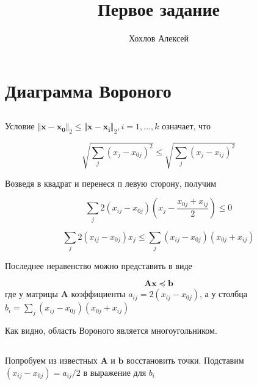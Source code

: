 
\title{Первое задание}
\author{
 	Хохлов Алексей \\
}
		

	\maketitle
	
	\section{Диаграмма Вороного}
	
	\subsection{}
	
	Условие $\Vert \mathbf{x} - \mathbf{x_0} \Vert_2 \leqslant \Vert \mathbf{x} - \mathbf{x_i} \Vert_2 , i=1,...,k$ означает, что
	
	\begin{equation}
	\sqrt {\sum_j (x_j-x_{0j})^2 }\leqslant \sqrt {\sum_j (x_j-x_{ij})^2 }
	\end{equation}
	
	Возведя в квадрат и перенеся п левую сторону, получим
	
	\begin{equation}
	\sum_j 2(x_{ij}-x_{0j})(x_j - \frac{x_{0j}+x_{ij}}{2}) \leqslant 0
	\end{equation}
	
	\begin{equation}
	\sum_j 2(x_{ij}-x_{0j})x_j \leqslant  	\sum_j (x_{ij}-x_{0j}) (x_{0j}+x_{ij}) 
	\end{equation}
	
	Последнее неравенство можно представить в виде
	
	\begin{equation}
	\mathbf{A} \mathbf{x} \preceq \mathbf{b}
	\end{equation}
	где у матрицы $\mathbf{A}$ коэффициенты $ a_{ij} = 2(x_{ij}-x_{0j})$, а у столбца $ b_i = \sum\limits_{j} (x_{ij}-x_{0j}) (x_{0j}+x_{ij}) $
	
	Как видно, область Вороного является многоугольником.
	
	\subsection{}
	
	Попробуем из известных $\mathbf{A}$ и $\mathbf{b}$ восстановить точки. Подставим $ (x_{ij}-x_{0j}) = a_{ij}/2$ в выражение для $b_i$
	
